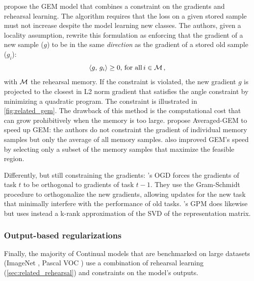 \cite{lopezpaz2017gem} propose the GEM model that combines a constraint on the gradients and
rehearsal learning. The algorithm requires that the loss on a given stored sample must not increase
despite the model learning new classes. The authors, given a locality assumption, rewrite this
formulation as enforcing that the gradient of a new sample ($g$) to be in the same \textit{direction} as
the gradient of a stored old sample ($g_i$):
%
\begin{equation}
      \langle g,\, g_i\rangle \ge 0,\, \text{for all}\, i \in \mathcal{M}\,,
\end{equation}
%
\noindent with $\mathcal{M}$ the rehearsal memory. If the constraint is violated, the new gradient $g$ is
projected to the closest in L2 norm gradient that satisfies the angle constraint by minimizing a
quadratic program. The constraint is illustrated in \autoref{fig:related_gem}. The drawback of this
method is the computational cost that can grow prohibitively when the memory is too large.
\cite{chaudhry2019AGEM} propose Averaged-GEM to speed up GEM: the authors do not constraint the
gradient of individual memory samples but only the average of all memory samples.
\cite{aljundi2019gradientselection} also improved GEM's speed by selecting only a subset of the
memory samples that maximize the feasible region.

Differently, but still constraining the gradients: \cite{farajtabar2020ogd}'s OGD forces the gradients of
task $t$ to be orthogonal to gradients of task $t-1$. They use the Gram-Schmidt procedure to
orthogonalize the new gradients, allowing updates for the new task that minimally interfere with the
performance of old tasks. \cite{saha2021gpm}'s GPM does likewise but uses instead a k-rank
approximation of the SVD of the representation matrix.


\subsubsection{Output-based regularizations}
\label{sec:related_regul_output}

Finally, the majority of Continual models that are benchmarked on large datasets (\eg ImageNet
\citep{deng2009imagenet}, Pascal VOC \citep{everingham2015pascalvoc}) use a combination of rehearsal
learning (\autoref{sec:related_rehearsal}) and constraints on the model's outputs.

